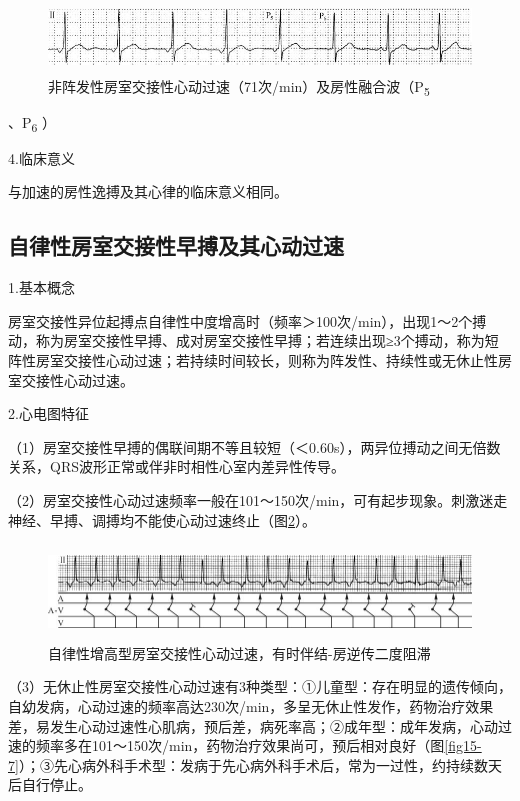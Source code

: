 \begin{figure}[!htbp]
 \centering
 \includegraphics[width=5.58333in,height=0.73958in]{./images/Image00271.jpg}
 \captionsetup{justification=centering}
 \caption{非阵发性房室交接性心动过速（71次/min）及房性融合波（P\textsubscript{5}}
 \label{fig15-5}
  \end{figure} 
、P\textsubscript{6} ）

4.临床意义

与加速的房性逸搏及其心律的临床意义相同。

\protect\hypertarget{text00022.htmlux5cux23subid269}{}{}

\subsection{自律性房室交接性早搏及其心动过速}

1.基本概念

房室交接性异位起搏点自律性中度增高时（频率＞100次/min），出现1～2个搏动，称为房室交接性早搏、成对房室交接性早搏；若连续出现≥3个搏动，称为短阵性房室交接性心动过速；若持续时间较长，则称为阵发性、持续性或无休止性房室交接性心动过速。

2.心电图特征

（1）房室交接性早搏的偶联间期不等且较短（＜0.60s），两异位搏动之间无倍数关系，QRS波形正常或伴非时相性心室内差异性传导。

（2）房室交接性心动过速频率一般在101～150次/min，可有起步现象。刺激迷走神经、早搏、调搏均不能使心动过速终止（图\ref{fig15-6}）。

\begin{figure}[!htbp]
 \centering
 \includegraphics[width=5.72917in,height=0.98958in]{./images/Image00272.jpg}
 \captionsetup{justification=centering}
 \caption{自律性增高型房室交接性心动过速，有时伴结-房逆传二度阻滞}
 \label{fig15-6}
  \end{figure} 

（3）无休止性房室交接性心动过速有3种类型：①儿童型：存在明显的遗传倾向，自幼发病，心动过速的频率高达230次/min，多呈无休止性发作，药物治疗效果差，易发生心动过速性心肌病，预后差，病死率高；②成年型：成年发病，心动过速的频率多在101～150次/min，药物治疗效果尚可，预后相对良好（图\ref{fig15-7}）；③先心病外科手术型：发病于先心病外科手术后，常为一过性，约持续数天后自行停止。

